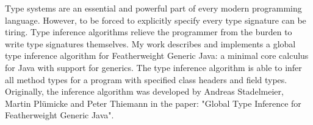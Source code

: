 Type systems are an essential and powerful part of every modern programming language.
However, to be forced to explicitly specify every type signature can be tiring.
Type inference algorithms relieve the programmer from the burden to write type signatures themselves.
My work describes and implements a global type inference algorithm for Featherweight Generic Java: a minimal core calculus for Java with support for generics.
The type inference algorithm is able to infer all method types for a program with specified class headers and field types.
Originally, the inference algorithm was developed by Andreas Stadelmeier, Martin Plümicke and Peter Thiemann in the paper: "Global Type Inference for Featherweight Generic Java".
